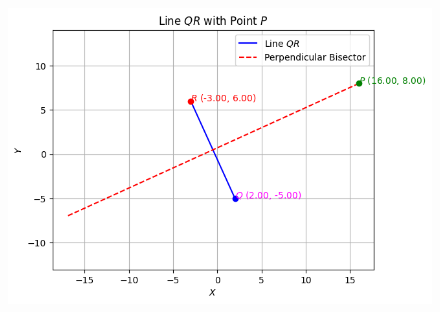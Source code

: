 \documentclass[journal]{IEEEtran}
\begin{document}
			               
	\begin{figure}[H]
		\centering
		\includegraphics[width=\textwidth]{plots/plot.png}
	\end{figure}
		
  
\end{document}
